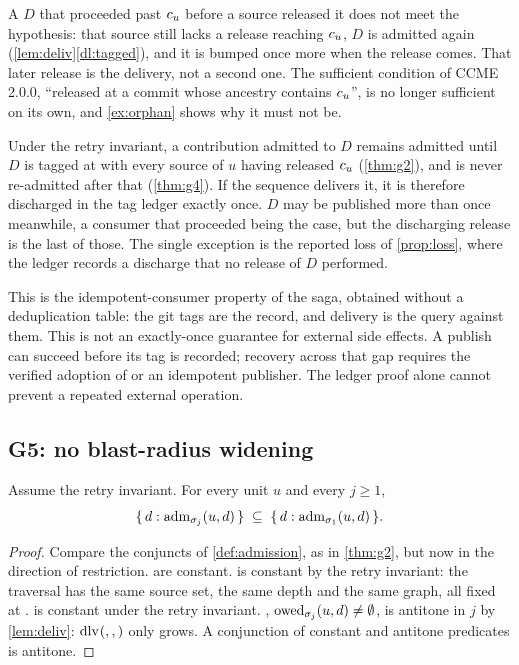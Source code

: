 A $D$ that proceeded past $c_{u}$ before a source released it does not meet
the hypothesis: that source still lacks a release reaching $c_{u}$, $D$ is
admitted again (\cref{lem:deliv}\ref{dl:tagged}), and it is bumped once more
when the release comes. That later release is the delivery, not a second one.
The sufficient condition of CCME 2.0.0, ``released at a commit whose ancestry
contains $c_{u}$'', is no longer sufficient on its own, and \cref{ex:orphan}
shows why it must not be.

\begin{corollary}
\label{cor:exactly-once}
Under the retry invariant, a contribution admitted to $D$ remains admitted
until $D$ is tagged at \Head{} with every source of $u$ having released
$c_{u}$ (\cref{thm:g2}), and is never re-admitted after that
(\cref{thm:g4}). If the sequence delivers it, it is therefore discharged in the
tag ledger exactly once. $D$ may be published more than once meanwhile, a
consumer that proceeded being the case, but the discharging release is the
last of those. The single exception is the reported loss of \cref{prop:loss},
where the ledger records a discharge that no release of $D$ performed.
\end{corollary}

This is the idempotent-consumer property of the saga, obtained without a
deduplication table: the git tags are the record, and delivery is the query
against them. This is not an exactly-once guarantee for external side effects.
A publish can succeed before its tag is recorded; recovery across that gap
requires the verified adoption of  or an idempotent publisher.
The ledger proof alone cannot prevent a repeated external operation.

\subsection{G5: no blast-radius widening}

\begin{theorem}
\label{thm:g5}
Assume the retry invariant. For every unit $u$ and every $j \geq 1$,
\[
  \{\, d : \mathrm{adm}_{\sigma_j}(u,d) \,\} \;\subseteq\; \{\, d : \mathrm{adm}_{\sigma_1}(u,d) \,\}.
\]
\end{theorem}

\begin{proof}
Compare the conjuncts of \cref{def:admission}, as in \cref{thm:g2}, but now in
the direction of restriction.  are constant.
 is constant by the retry invariant: the traversal has
the same source set, the same depth and the same graph, all fixed at \Head{}.
 is constant under the retry invariant. ,
$\mathrm{owed}_{\sigma_j}(u,d) \neq \emptyset$, is antitone in $j$ by \cref{lem:deliv}:
$\mathrm{dlv}_{}(,,)$ only grows. A conjunction of constant and antitone predicates
is antitone.
\end{proof}

